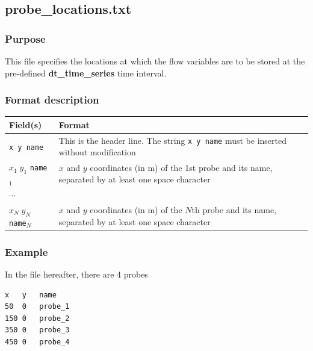 
\hypertarget{ProbeLocationFileFormat}{}
\subsection{probe\_locations.txt}\label{sec:probe_locations}
\subsubsection{Purpose}
This file specifies the locations at which the flow variables are to be stored at the pre-defined \textbf{dt\_time\_series} time interval.
%
\subsubsection{Format description}
\begin{tabular}{p{5cm} | p{10cm}}
\hline
Field(s) & Format \\
\hline
\hline
\texttt{x  y  name} & This is the header line. The string \texttt{x  y  name} must be inserted without modification \\
\hline
$x_1 \; y_1$ \texttt{name}$_1$ & $x$ and $y$ coordinates (in m) of the 1st probe and its name, separated by at least one space character \\
\hline
$\cdots$ & \\
\hline
$x_N \; y_N$ \texttt{name}$_N$ & $x$ and $y$ coordinates (in m) of the $N$th probe and its name, separated by at least one space character \\
\hline
\end{tabular}
%
\subsubsection{Example}
In the file hereafter, there are 4 probes
\begin{verbatim}
x	y	name
50	0	probe_1
150	0	probe_2
350	0	probe_3
450	0	probe_4
\end{verbatim}